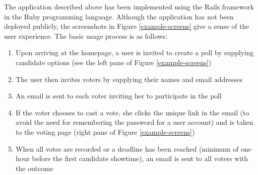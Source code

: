 \documentclass[12pt,letterpaper]{article} %
\begin{document}
The application described above has been implemented using the Rails framework in the Ruby programming language. Although the application has not been deployed publicly, the screenshots in Figure \ref{example-screens} give a sense of the user experience. The basic usage process is as follows:
\begin{enumerate}
\item Upon arriving at the homepage, a user is invited to create a poll by supplying candidate options (see the left pane of Figure \ref{example-screens})
\item The user then invites voters by supplying their names and email addresses
\item An email is sent to each voter inviting her to participate in the poll
\item If the voter chooses to cast a vote, she clicks the unique link in the email (to avoid the need for remembering the password for a user account) and is taken to the voting page (right pane of Figure \ref{example-screens})
\item When all votes are recorded or a deadline has been reached (minimum of one hour before the first candidate showtime), an email is sent to all voters with the outcome
\end{enumerate}
\end{document}
